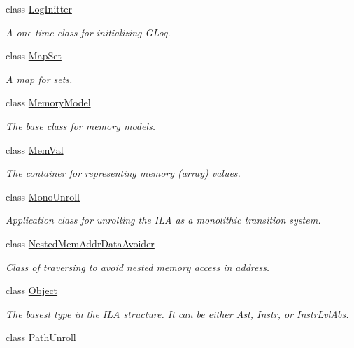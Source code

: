 \begin{DoxyCompactItemize}
class \mbox{\hyperlink{classilang_1_1_log_initter}{Log\+Initter}}
\begin{DoxyCompactList}\small\item\em A one-\/time class for initializing G\+Log. \end{DoxyCompactList}\item 
class \mbox{\hyperlink{classilang_1_1_map_set}{Map\+Set}}
\begin{DoxyCompactList}\small\item\em A map for sets. \end{DoxyCompactList}\item 
class \mbox{\hyperlink{classilang_1_1_memory_model}{Memory\+Model}}
\begin{DoxyCompactList}\small\item\em The base class for memory models. \end{DoxyCompactList}\item 
class \mbox{\hyperlink{classilang_1_1_mem_val}{Mem\+Val}}
\begin{DoxyCompactList}\small\item\em The container for representing memory (array) values. \end{DoxyCompactList}\item 
class \mbox{\hyperlink{classilang_1_1_mono_unroll}{Mono\+Unroll}}
\begin{DoxyCompactList}\small\item\em Application class for unrolling the I\+LA as a monolithic transition system. \end{DoxyCompactList}\item 
class \mbox{\hyperlink{classilang_1_1_nested_mem_addr_data_avoider}{Nested\+Mem\+Addr\+Data\+Avoider}}
\begin{DoxyCompactList}\small\item\em Class of traversing to avoid nested memory access in address. \end{DoxyCompactList}\item 
class \mbox{\hyperlink{classilang_1_1_object}{Object}}
\begin{DoxyCompactList}\small\item\em The basest type in the I\+LA structure. It can be either \mbox{\hyperlink{classilang_1_1_ast}{Ast}}, \mbox{\hyperlink{classilang_1_1_instr}{Instr}}, or \mbox{\hyperlink{classilang_1_1_instr_lvl_abs}{Instr\+Lvl\+Abs}}. \end{DoxyCompactList}\item 
class \mbox{\hyperlink{classilang_1_1_path_unroll}{Path\+Unroll}}

\end{DoxyCompactItemize}
